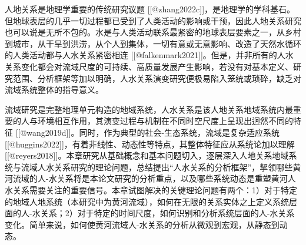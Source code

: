 
人地关系是地理学重要的传统研究议题 [[@zhang2022c]]，是地理学的学科基石。但地球表层的几乎一切过程都已受到了人类活动的影响或干预，因此人地关系研究也可以说是无所不包的。水是与人类活动联系最紧密的地球表层要素之一，从乡村到城市，从干旱到洪涝，从个人到集体，一切有意或无意影响、改造了天然水循环的人类活动都与人水关系紧密相连 [[@falkenmark2021]]。但是，并非所有的人水关系变化都会对流域尺度的可持续、高质量发展产生影响，若没有对基本定义、研究范围、分析框架等加以明确，人水关系演变研究便极易陷入笼统或琐碎，缺乏对流域系统整体的指导意义。

流域研究是完整地理单元构造的地域系统，人水关系是该人地关系地域系统内最重要的人与环境相互作用，其演变过程与机制在不同时空尺度上呈现出迥然不同的特征 [[@wang2019d]]。同时，作为典型的社会-生态系统，流域是复杂适应系统 [[@huggins2022]]，有着非线性、动态性等特点，其整体特征应从系统论加以理解 [[@reyers2018]]。本章研究从基础概念和基本问题切入，逐层深入人地关系地域系统与流域人水关系研究的理论问题，总结提出“人水关系的分析框架”，挈领哪些黄河流域的人-水关系将是本论文研究的分析重点，以及哪些系统动态是重塑黄河人水关系需要关注的重要信号。本章试图解决的关键理论问题有两个：1）对于特定的地域人地系统（本研究中为黄河流域），如何在无限的关系实体之上定义系统层面的人-水关系；2）对于特定的时间尺度，如何识别和分析系统层面的人-水关系变化。简单来说，如何使黄河流域人-水关系的分析从微观到宏观，从静态到动态。
